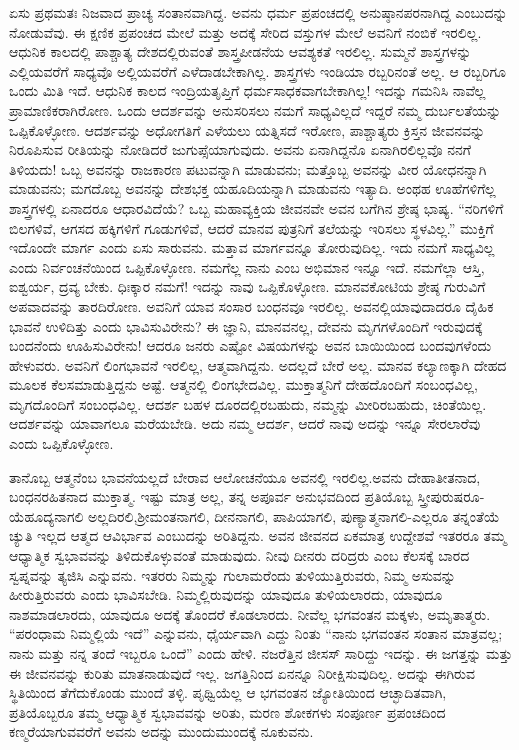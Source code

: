 ಏಸು ಪ್ರಥಮತಃ ನಿಜವಾದ ಪ್ರಾಚ್ಯ ಸಂತಾನವಾಗಿದ್ದ. ಅವನು ಧರ್ಮ ಪ್ರಪಂಚದಲ್ಲಿ ಅನುಷ್ಠಾನಪರನಾಗಿದ್ದ ಎಂಬುದನ್ನು ನೋಡುವೆವು. ಈ ಕ್ಷಣಿಕ ಪ್ರಪಂಚದ ಮೇಲೆ ಮತ್ತು ಅದಕ್ಕೆ ಸೇರಿದ ವಸ್ತುಗಳ ಮೇಲೆ ಅವನಿಗೆ ನಂಬಿಕೆ ಇರಲಿಲ್ಲ. ಆಧುನಿಕ ಕಾಲದಲ್ಲಿ ಪಾಶ್ಚಾತ್ಯ ದೇಶದಲ್ಲಿರುವಂತೆ ಶಾಸ್ತ್ರಪೀಡನೆಯ ಆವಶ್ಯಕತೆ ಇರಲಿಲ್ಲ. ಸುಮ್ಮನೆ ಶಾಸ್ತ್ರಗಳನ್ನು ಎಲ್ಲಿಯವರೆಗೆ ಸಾಧ್ಯವೊ ಅಲ್ಲಿಯವರೆಗೆ ಎಳೆದಾಡಬೇಕಾಗಿಲ್ಲ. ಶಾಸ್ತ್ರಗಳು ಇಂಡಿಯಾ ರಬ್ಬರಿನಂತೆ ಅಲ್ಲ. ಆ ರಬ್ಬರಿಗೂ ಒಂದು ಮಿತಿ ಇದೆ. ಆಧುನಿಕ ಕಾಲದ ಇಂದ್ರಿಯತೃಪ್ತಿಗೆ ಧರ್ಮ\break ಸಾಧಕವಾಗಬೇಕಾಗಿಲ್ಲ! ಇದನ್ನು ಗಮನಿಸಿ ನಾವೆಲ್ಲ ಪ್ರಾಮಾಣಿಕರಾಗಿರೋಣ. ಒಂದು ಆದರ್ಶವನ್ನು ಅನುಸರಿಸಲು ನಮಗೆ ಸಾಧ್ಯವಿಲ್ಲದೆ ಇದ್ದರೆ ನಮ್ಮ ದುರ್ಬಲತೆಯನ್ನು ಒಪ್ಪಿಕೊಳ್ಳೋಣ. ಆದರ್ಶವನ್ನು ಅಧೋಗತಿಗೆ ಎಳೆಯಲು ಯತ್ನಿಸದೆ ಇರೋಣ, ಪಾಶ್ಚಾತ್ಯರು ಕ್ರಿಸ್ತನ ಜೀವನವನ್ನು ನಿರೂಪಿಸುವ ರೀತಿಯನ್ನು ನೋಡಿದರೆ ಜುಗುಪ್ಸೆಯಾಗುವುದು. ಅವನು ಏನಾಗಿದ್ದನೊ ಏನಾಗಿರಲಿಲ್ಲವೊ ನನಗೆ ತಿಳಿಯದು! ಒಬ್ಬ ಅವನನ್ನು ರಾಜಕಾರಣ ಪಟುವನ್ನಾಗಿ ಮಾಡುವನು; ಮತ್ತೊಬ್ಬ ಅವನನ್ನು ವೀರ ಯೋಧನನ್ನಾಗಿ ಮಾಡುವನು; ಮಗದೊಬ್ಬ ಅವನನ್ನು ದೇಶಭಕ್ತ ಯಹೂದಿಯನ್ನಾಗಿ ಮಾಡುವನು ಇತ್ಯಾದಿ. ಅಂಥಹ ಊಹೆಗಳಿಗೆಲ್ಲ ಶಾಸ್ತ್ರಗಳಲ್ಲಿ ಏನಾದರೂ ಆಧಾರವಿದೆಯೆ? ಒಬ್ಬ ಮಹಾವ್ಯಕ್ತಿಯ ಜೀವನವೇ ಅವನ ಬಗೆಗಿನ ಶ್ರೇಷ್ಠ ಭಾಷ್ಯ. “ನರಿಗಳಿಗೆ ಬಿಲಗಳಿವೆ, ಆಗಸದ ಹಕ್ಕಿಗಳಿಗೆ ಗೂಡುಗಳಿವೆ, ಆದರೆ ಮಾನವ ಪುತ್ರನಿಗೆ ತಲೆಯನ್ನು ಇರಿಸಲು ಸ್ಥಳವಿಲ್ಲ.” ಮುಕ್ತಿಗೆ ಇದೊಂದೇ ಮಾರ್ಗ ಎಂದು ಏಸು ಸಾರುವನು. ಮತ್ತಾವ ಮಾರ್ಗವನ್ನೂ ತೋರುವುದಿಲ್ಲ. ಇದು ನಮಗೆ ಸಾಧ್ಯವಿಲ್ಲ ಎಂದು ನಿರ್ವಂಚನೆಯಿಂದ ಒಪ್ಪಿಕೊಳ್ಳೋಣ. ನಮಗೆಲ್ಲ ನಾನು ಎಂಬ ಅಭಿಮಾನ ಇನ್ನೂ ಇದೆ. ನಮಗೆಲ್ಲಾ ಆಸ್ತಿ, ಐಶ್ವರ್ಯ, ದ್ರವ್ಯ ಬೇಕು. ಧಿಃಕ್ಕಾರ ನಮಗೆ! ಇದನ್ನು ನಾವು ಒಪ್ಪಿಕೊಳ್ಳೋಣ. ಮಾನವಕೋಟಿಯ ಶ್ರೇಷ್ಠ ಗುರುವಿಗೆ ಅಪವಾದ\break ವನ್ನು ತಾರದಿರೋಣ. ಅವನಿಗೆ ಯಾವ ಸಂಸಾರ ಬಂಧನವೂ ಇರಲಿಲ್ಲ. ಅವನಲ್ಲಿ\break ಯಾವುದಾದರೂ ದೈಹಿಕ ಭಾವನೆ ಉಳಿದಿತ್ತು ಎಂದು ಭಾವಿಸುವಿರೇನು? ಈ ಜ್ಞಾನಿ, ಮಾನವನಲ್ಲ, ದೇವನು ಮೃಗಗಳೊಂದಿಗೆ ಇರುವುದಕ್ಕೆ ಬಂದನೆಂದು ಊಹಿಸುವಿರೇನು! ಆದರೂ ಜನರು ಎಷ್ಟೋ ವಿಷಯಗಳನ್ನು ಅವನ ಬಾಯಿಯಿಂದ ಬಂದವುಗಳೆಂದು ಹೇಳುವರು. ಅವನಿಗೆ ಲಿಂಗಭಾವನೆ ಇರಲಿಲ್ಲ, ಆತ್ಮವಾಗಿದ್ದನು. ಅದಲ್ಲದೆ ಬೇರೆ ಅಲ್ಲ. ಮಾನವ ಕಲ್ಯಾಣಕ್ಕಾಗಿ ದೇಹದ ಮೂಲಕ ಕೆಲಸಮಾಡುತ್ತಿದ್ದನು ಅಷ್ಟೆ. ಆತ್ಮನಲ್ಲಿ ಲಿಂಗಭೇದವಿಲ್ಲ. ಮುಕ್ತಾತ್ಮನಿಗೆ ದೇಹದೊಂದಿಗೆ ಸಂಬಂಧವಿಲ್ಲ, ಮೃಗದೊಂದಿಗೆ ಸಂಬಂಧವಿಲ್ಲ. ಆದರ್ಶ ಬಹಳ ದೂರ\-ದಲ್ಲಿರಬಹುದು, ನಮ್ಮನ್ನು ಮೀರಿರಬಹುದು, ಚಿಂತೆಯಿಲ್ಲ. ಆದರ್ಶವನ್ನು ಯಾವಾಗಲೂ ಮರೆಯಬೇಡಿ. ಅದು ನಮ್ಮ ಆದರ್ಶ, ಆದರೆ ನಾವು ಅದನ್ನು ಇನ್ನೂ ಸೇರಲಾರೆವು ಎಂದು ಒಪ್ಪಿಕೊಳ್ಳೋಣ.

ತಾನೊಬ್ಬ ಆತ್ಮನೆಂಬ ಭಾವನೆಯಲ್ಲದೆ ಬೇರಾವ ಆಲೋಚನೆಯೂ ಅವನಲ್ಲಿ ಇರಲಿಲ್ಲ.\break ಅವನು ದೇಹಾತೀತನಾದ, ಬಂಧನರಹಿತನಾದ ಮುಕ್ತಾತ್ಮ. ಇಷ್ಟು ಮಾತ್ರ ಅಲ್ಲ, ತನ್ನ ಅಪೂರ್ವ ಅನುಭವದಿಂದ ಪ್ರತಿಯೊಬ್ಬ ಸ್ತ್ರೀಪುರುಷರೂ- ಯೆಹೂದ್ಯನಾಗಲಿ ಅಲ್ಲದಿರಲಿ,\break ಶ‍್ರೀಮಂತನಾಗಲಿ, ದೀನನಾಗಲಿ, ಪಾಪಿಯಾಗಲಿ, ಪುಣ್ಯಾತ್ಮನಾಗಲಿ-ಎಲ್ಲರೂ ತನ್ನಂತೆಯೆ ಚ್ಯುತಿ ಇಲ್ಲದ ಆತ್ಮದ ಆವಿರ್ಭಾವ ಎಂಬುದನ್ನು ಅರಿತಿದ್ದನು. ಅವನ ಜೀವನದ ಏಕಮಾತ್ರ ಉದ್ದೇಶವೆ ಇತರರೂ ತಮ್ಮ ಆಧ್ಯಾತ್ಮಿಕ ಸ್ವಭಾವವನ್ನು ತಿಳಿದುಕೊಳ್ಳುವಂತೆ ಮಾಡುವುದು. ನೀವು ದೀನರು ದರಿದ್ರರು ಎಂಬ ಕೆಲಸಕ್ಕೆ ಬಾರದ ಸ್ವಪ್ನವನ್ನು ತ್ಯಜಿಸಿ ಎನ್ನುವನು. ಇತರರು ನಿಮ್ಮನ್ನು ಗುಲಾಮರೆಂದು ತುಳಿಯುತ್ತಿರುವರು, ನಿಮ್ಮ ಅಸುವನ್ನು ಹೀರುತ್ತಿರುವರು ಎಂದು ಭಾವಿಸಬೇಡಿ. ನಿಮ್ಮಲ್ಲಿರುವುದನ್ನು ಯಾವುದೂ ತುಳಿಯಲಾರದು, ಯಾವುದೂ ನಾಶಮಾಡಲಾರದು, ಯಾವುದೂ ಅದಕ್ಕೆ ತೊಂದರೆ ಕೊಡಲಾರದು. ನೀವೆಲ್ಲ ಭಗವಂತನ ಮಕ್ಕಳು, ಅಮೃತಾತ್ಮರು. “ಪರಂಧಾಮ ನಿಮ್ಮಲ್ಲಿಯೆ ಇದೆ” ಎನ್ನುವನು, ಧೈರ್ಯವಾಗಿ ಎದ್ದು ನಿಂತು “ನಾನು ಭಗವಂತನ ಸಂತಾನ ಮಾತ್ರವಲ್ಲ; ನಾನು ಮತ್ತು ನನ್ನ ತಂದೆ ಇಬ್ಬರೂ ಒಂದೆ” ಎಂದು ಹೇಳಿ. ನಜರೆತ್ತಿನ ಜೀಸಸ್​ ಸಾರಿದ್ದು ಇದನ್ನು. ಈ ಜಗತ್ತನ್ನು ಮತ್ತು ಈ ಜೀವನವನ್ನು ಕುರಿತು ಮಾತನಾಡುವುದೆ ಇಲ್ಲ. ಜಗತ್ತಿನಿಂದ ಏನನ್ನೂ ನಿರೀಕ್ಷಿಸುವುದಿಲ್ಲ. ಅದನ್ನು ಈಗಿರುವ ಸ್ಥಿತಿಯಿಂದ ತೆಗೆದುಕೊಂಡು ಮುಂದೆ ತಳ್ಳಿ. ಪೃಥ್ವಿಯೆಲ್ಲ ಆ ಭಗವಂತನ ಜ್ಯೋತಿಯಿಂದ ಆಚ್ಛಾದಿತವಾಗಿ, ಪ್ರತಿಯೊಬ್ಬರೂ ತಮ್ಮ ಆಧ್ಯಾತ್ಮಿಕ ಸ್ವಭಾವವನ್ನು ಅರಿತು, ಮರಣ ಶೋಕಗಳು ಸಂಪೂರ್ಣ ಪ್ರಪಂಚದಿಂದ ಕಣ್ಮರೆಯಾಗುವವರೆಗೆ ಅವನು ಅದನ್ನು ಮುಂದುಮುಂದಕ್ಕೆ ನೂಕುವನು.

